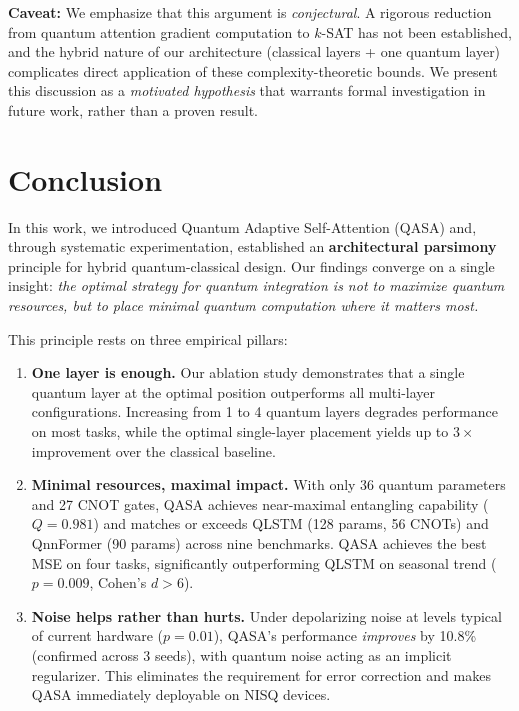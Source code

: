 \documentclass[conference]{IEEEtran}
\begin{document}
\textbf{Caveat:} We emphasize that this argument is \textit{conjectural}. A rigorous reduction from quantum attention gradient computation to $k$-SAT has not been established, and the hybrid nature of our architecture (classical layers + one quantum layer) complicates direct application of these complexity-theoretic bounds. We present this discussion as a \textit{motivated hypothesis} that warrants formal investigation in future work, rather than a proven result.

\section{Conclusion}

In this work, we introduced Quantum Adaptive Self-Attention (QASA) and, through systematic experimentation, established an \textbf{architectural parsimony} principle for hybrid quantum-classical design. Our findings converge on a single insight: \emph{the optimal strategy for quantum integration is not to maximize quantum resources, but to place minimal quantum computation where it matters most.}

This principle rests on three empirical pillars:

\begin{enumerate}
    \item \textbf{One layer is enough.} Our ablation study demonstrates that a single quantum layer at the optimal position outperforms all multi-layer configurations. Increasing from 1 to 4 quantum layers degrades performance on most tasks, while the optimal single-layer placement yields up to $3\times$ improvement over the classical baseline.

    \item \textbf{Minimal resources, maximal impact.} With only 36 quantum parameters and 27 CNOT gates, QASA achieves near-maximal entangling capability ($Q = 0.981$) and matches or exceeds QLSTM (128 params, 56 CNOTs) and QnnFormer (90 params) across nine benchmarks. QASA achieves the best MSE on four tasks, significantly outperforming QLSTM on seasonal trend ($p = 0.009$, Cohen's $d > 6$).

    \item \textbf{Noise helps rather than hurts.} Under depolarizing noise at levels typical of current hardware ($p = 0.01$), QASA's performance \emph{improves} by 10.8\% (confirmed across 3 seeds), with quantum noise acting as an implicit regularizer. This eliminates the requirement for error correction and makes QASA immediately deployable on NISQ devices.
\end{enumerate}
\end{document}
